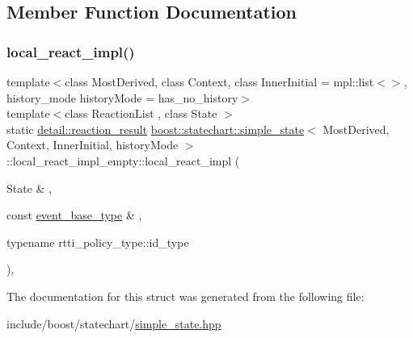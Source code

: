 \subsection{Member Function Documentation}
\mbox{\label{structboost_1_1statechart_1_1simple__state_1_1local__react__impl__empty_a4c956ba72122a657e27391a6d49832b9}} 
\subsubsection{\texorpdfstring{local\+\_\+react\+\_\+impl()}{local\_react\_impl()}}
{\footnotesize\ttfamily template$<$class Most\+Derived, class Context, class Inner\+Initial = mpl\+::list$<$$>$, history\+\_\+mode history\+Mode = has\+\_\+no\+\_\+history$>$ \\
template$<$class Reaction\+List , class State $>$ \\
static \mbox{\hyperlink{namespaceboost_1_1statechart_1_1detail_ab091bbb4c29327fb46ee479ea1b7255b}{detail\+::reaction\+\_\+result}} \mbox{\hyperlink{classboost_1_1statechart_1_1simple__state}{boost\+::statechart\+::simple\+\_\+state}}$<$ Most\+Derived, Context, Inner\+Initial, history\+Mode $>$\+::local\+\_\+react\+\_\+impl\+\_\+empty\+::local\+\_\+react\+\_\+impl (\begin{DoxyParamCaption}\item[{State \&}]{,  }\item[{const \mbox{\hyperlink{classboost_1_1statechart_1_1simple__state_a153e115715f5d828021a273ce282ba9b}{event\+\_\+base\+\_\+type}} \&}]{,  }\item[{typename rtti\+\_\+policy\+\_\+type\+::id\+\_\+type}]{ }\end{DoxyParamCaption})\hspace{0.3cm}{\ttfamily [inline]}, {\ttfamily [static]}}



The documentation for this struct was generated from the following file\+:\begin{DoxyCompactItemize}
\item 
include/boost/statechart/\mbox{\hyperlink{simple__state_8hpp}{simple\+\_\+state.\+hpp}}\end{DoxyCompactItemize}
